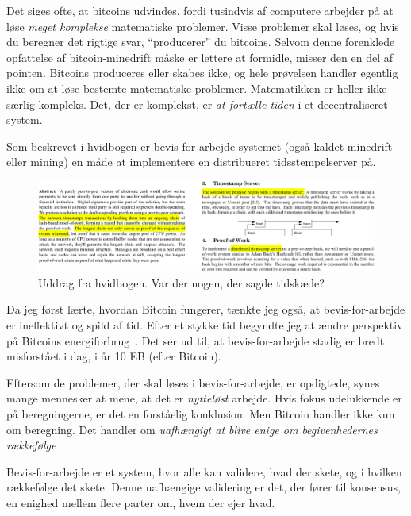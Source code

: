 \documentclass[paper=6in:9in,pagesize=pdftex,
               headinclude=on,footinclude=on,12pt]{scrbook}
\begin{document}
Det siges ofte, at bitcoins udvindes, fordi tusindvis af computere arbejder på at løse \textit{meget komplekse} matematiske problemer. Visse problemer skal løses, og hvis du beregner det rigtige svar, \enquote{producerer} du bitcoins. Selvom denne forenklede opfattelse af bitcoin-minedrift måske er lettere at formidle, misser den en del af pointen. Bitcoins produceres eller skabes ikke, og hele prøvelsen handler egentlig ikke om at løse bestemte matematiske problemer. Matematikken er heller ikke særlig kompleks. Det, der er komplekst, er \textit{at fortælle tiden} i et decentraliseret system.

Som beskrevet i hvidbogen er bevis-for-arbejde-systemet (også kaldet minedrift eller mining) en måde at implementere en distribueret tidsstempelserver på.\begin{figure}
  \includegraphics{assets/images/bitcoin-whitepaper-timestamp-wide.png}
  \caption{Uddrag fra hvidbogen. Var der nogen, der sagde tidskæde?}
  \label{fig:bitcoin-whitepaper-timestamp-wide}
\end{figure}

Da jeg først lærte, hvordan Bitcoin fungerer, tænkte jeg også, at bevis-for-arbejde er ineffektivt og spild af tid. Efter et stykke tid begyndte jeg at ændre perspektiv på Bitcoins energiforbrug~\cite{gigi:energy}. Det ser ud til, at bevis-for-arbejde stadig er bredt misforstået i dag, i år 10 EB (efter Bitcoin).

Eftersom de problemer, der skal løses i bevis-for-arbejde, er opdigtede, synes mange mennesker at mene, at det er \textit{nytteløst} arbejde. Hvis fokus udelukkende er på beregningerne, er det en forståelig konklusion. Men Bitcoin handler ikke kun om beregning. Det handler om \textit{uafhængigt at blive enige om begivenhedernes rækkefølge}

Bevis-for-arbejde er et system, hvor alle kan validere, hvad der skete, og i hvilken rækkefølge det skete. Denne uafhængige validering er det, der fører til konsensus, en enighed mellem flere parter om, hvem der ejer hvad.
\end{document}
